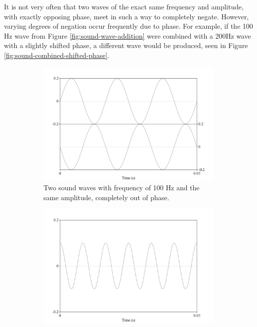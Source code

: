 It is not very often that two waves of the exact same frequency and amplitude, with exactly opposing phase, meet in such a way to completely negate.  However, varying degrees of negation occur frequently due to phase.  For example, if the 100 Hz wave from Figure \ref{fig:sound-wave-addition} were combined with a 200Hz wave with a slightly shifted phase, a different wave would be produced, seen in Figure \ref{fig:sound-combined-shifted-phase}.  

\begin{figure}[h!]
\begin{subfigure}{0.5\textwidth}
  \includegraphics[width=\textwidth]{figure/wave-out-of-phase.png}
  \caption{Two sound waves with frequency of 100 Hz and the same amplitude, completely out of phase.}
  \label{fig:wave-out-of-phase2}
\end{subfigure}
\qquad
\begin{subfigure}{0.5\textwidth}
  \includegraphics[width=\textwidth]{figure/sound-wave-addition-200hz-shifted.png}

\end{subfigure}
\end{figure}
